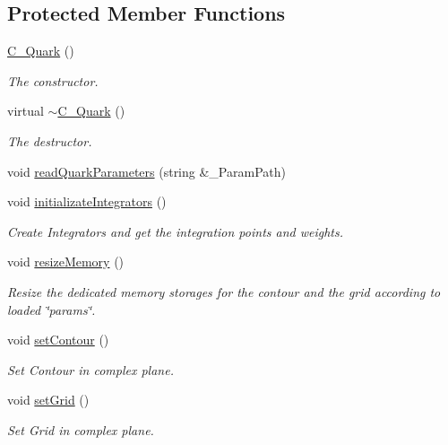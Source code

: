 \subsection*{Protected Member Functions}
\begin{DoxyCompactItemize}
\item 
\hyperlink{class_c___quark_a7ceb205746e82ecf1c792ec9f11c037a}{C\-\_\-\-Quark} ()
\begin{DoxyCompactList}\small\item\em The constructor. \end{DoxyCompactList}\item 
virtual \hyperlink{class_c___quark_a49f6931861a7144c7215abdbcfba0b7d}{$\sim$\-C\-\_\-\-Quark} ()
\begin{DoxyCompactList}\small\item\em The destructor. \end{DoxyCompactList}\item 
void \hyperlink{class_c___quark_a8705085256b1afed49a029e7566be3a6}{read\-Quark\-Parameters} (string \&\-\_\-\-Param\-Path)
\item 
void \hyperlink{class_c___quark_aff74305e3c468db6ec6cbd63e04fff9a}{initializate\-Integrators} ()
\begin{DoxyCompactList}\small\item\em Create Integrators and get the integration points and weights. \end{DoxyCompactList}\item 
void \hyperlink{class_c___quark_a569aee23f1aafca5fe383ad4341df8e8}{resize\-Memory} ()
\begin{DoxyCompactList}\small\item\em Resize the dedicated memory storages for the contour and the grid according to loaded \char`\"{}params\char`\"{}. \end{DoxyCompactList}\item 
void \hyperlink{class_c___quark_a56f87c010401c5cd211cdd3edd53b2a0}{set\-Contour} ()
\begin{DoxyCompactList}\small\item\em Set Contour in complex plane. \end{DoxyCompactList}\item 
void \hyperlink{class_c___quark_aa5f4509e09ec22aae258b25dbf1cb328}{set\-Grid} ()
\begin{DoxyCompactList}\small\item\em Set Grid in complex plane. \end{DoxyCompactList}\item 

\end{DoxyCompactItemize}
